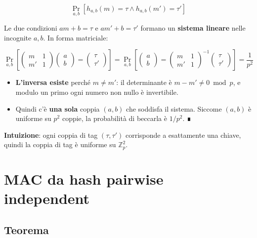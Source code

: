 \[
\Pr_{a,b}[h_{a,b}(m) = \tau \wedge h_{a,b}(m') = \tau']
\]

Le due condizioni \(a m + b = \tau\) e \(a m' + b = \tau'\) formano un \textbf{sistema lineare} nelle incognite \(a, b\). In forma matriciale:

\[
\Pr_{a,b}\left[ \begin{pmatrix} m & 1 \\ m' & 1 \end{pmatrix} \begin{pmatrix} a \\ b \end{pmatrix} = \begin{pmatrix} \tau \\ \tau' \end{pmatrix} \right] = \Pr_{a,b}\left[ \begin{pmatrix} a \\ b \end{pmatrix} = \begin{pmatrix} m & 1 \\ m' & 1 \end{pmatrix}^{-1} \begin{pmatrix} \tau \\ \tau' \end{pmatrix} \right] = \frac{1}{p^2}
\]

\begin{itemize}
\tightlist
\item
  \textbf{L'inversa esiste} perché \(m \ne m'\): il determinante è \(m - m' \ne 0 \bmod p\), e modulo un primo ogni numero non nullo è invertibile.
\item
  Quindi c'è \textbf{una sola} coppia \((a, b)\) che soddisfa il sistema. Siccome \((a, b)\) è uniforme su \(p^2\) coppie, la probabilità di beccarla è \(1/p^2\). ∎
\end{itemize}

\textbf{Intuizione}: ogni coppia di tag \((\tau, \tau')\) corrisponde a esattamente una chiave, quindi la coppia di tag è uniforme su \(\mathbb{Z}_p^2\).

\section{MAC da hash pairwise independent}

\subsection{Teorema}

